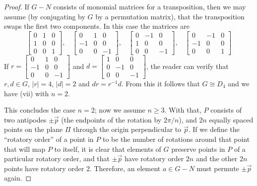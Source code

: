 \documentclass[leqno]{book}
\begin{document}
\begin{proof}
If $G-N$ consists of monomial matrices for a transposition, then we may assume (by conjugating by $G$ by a permutation matrix), that the transposition swaps the first two components.  In this case the matrices are
$$\begin{bmatrix}0&1&0\\1&0&0\\0&0&1\end{bmatrix},~~~~\begin{bmatrix}0&1&0\\-1&0&0\\0&0&-1\end{bmatrix},~~~~\begin{bmatrix}0&-1&0\\1&0&0\\0&0&-1\end{bmatrix},~~~~\begin{bmatrix}0&-1&0\\-1&0&0\\0&0&1\end{bmatrix}$$
If $r=\begin{bmatrix}0&1&0\\-1&0&0\\0&0&-1\end{bmatrix}$ and $d=\begin{bmatrix}1&0&0\\0&-1&0\\0&0&-1\end{bmatrix}$, the reader can verify that $r,d\in G$, $|r|=4$, $|d|=2$ and $dr=r^{-1}d$.  From this it follows that $G\cong D_4$ and we have (vii) with $n=2$.

This concludes the case $n=2$; now we assume $n\geqslant 3$.  With that, $P$ consists of two antipodes $\pm\vec p$ (the endpoints of the rotation by $2\pi/n$), and $2n$ equally spaced points on the plane $\Pi$ through the origin perpendicular to $\vec p$.  If we define the ``rotatory order'' of a point in $P$ to be the number of rotations around that point that will map $P$ to itself, it is clear that elements of $G$ preserve points in $P$ of a particular rotatory order, and that $\pm\vec p$ have rotatory order $2n$ and the other $2n$ points have rotatory order $2$.  Therefore, an element $a\in G-N$ must permute $\pm\vec p$ again.


\end{proof}
\end{document}
